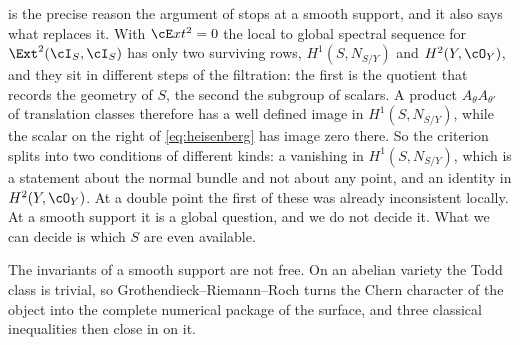 \begin{remark}\label{rem:obstructionmoves}
 is the precise reason the argument of
 stops at a smooth support, and it also says what
replaces it. With $\cE xt^{2}=0$ the local to global spectral sequence for
$\Ext^{2}(\cI_{S},\cI_{S})$ has only two surviving rows, $H^{1}(S,N_{S/Y})$
and $H^{2}(Y,\cO_{Y})$, and they sit in different steps of the filtration: the
first is the quotient that records the geometry of $S$, the second the
subgroup of scalars. A product $A_{\theta}A_{\theta'}$ of translation classes
therefore has a well defined image in $H^{1}(S,N_{S/Y})$, while the scalar on
the right of \eqref{eq:heisenberg} has image zero there. So the criterion
splits into two conditions of different kinds: a vanishing in
$H^{1}(S,N_{S/Y})$, which is a statement about the normal bundle and not about
any point, and an identity in $H^{2}(Y,\cO_{Y})$. At a double point the first
of these was already inconsistent locally. At a smooth support it is a global
question, and we do not decide it. What we can decide is which $S$ are even
available.
\end{remark}

The invariants of a smooth support are not free. On an abelian variety the
Todd class is trivial, so Grothendieck--Riemann--Roch turns the Chern
character of the object into the complete numerical package of the surface,
and three classical inequalities then close in on it.

